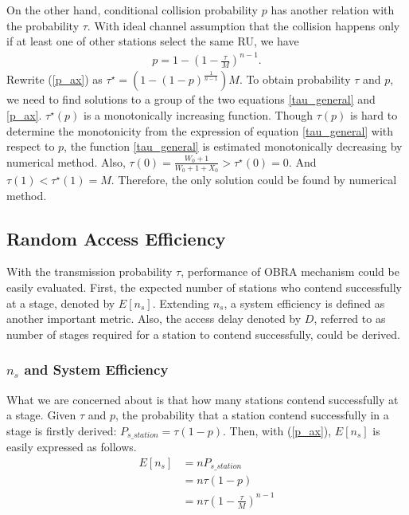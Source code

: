 \documentclass[journal]{IEEEtran}
\begin{document}
On the other hand, conditional collision probability $p$ has another relation with the probability $\tau$. 
With ideal channel assumption that the collision happens only if at least one of other stations select the same RU, we have 
\begin{align}
\label{p_ax}
p = 1-\left( 1-\frac{\tau}{M} \right)^{n-1}.
\end{align}
Rewrite (\ref{p_ax}) as $\tau^\star = \left(1-(1-p)^\frac{1}{n-1} \right)M$. 
To obtain probability $\tau$ and $p$, we need to find solutions to a group of the two equations \ref{tau_general} and \ref{p_ax}.
$\tau^\star(p)$ is a monotonically increasing function. 
Though $\tau(p)$ is hard to determine the monotonicity from the expression of equation \ref{tau_general} with respect to $p$, the  function \ref{tau_general} is estimated monotonically decreasing by numerical method. 
Also, $\tau(0) = \frac{W_0+1}{W_0+1+X_0}> \tau^\star(0) = 0$.
And $\tau(1) < \tau^\star(1) = M$. 
Therefore, the only solution could be found by numerical method.



\subsection{Random Access Efficiency}
With the transmission probability $\tau$, performance of OBRA mechanism could be easily evaluated. 
First, the expected number of stations who contend successfully at a stage, denoted by $E[n_s]$. 
Extending $n_s$, a system efficiency is defined as another important metric.
Also, the access delay denoted by $D$, referred to as number of stages required for a station to contend successfully, could be derived. 

\subsubsection{$n_s$ and System Efficiency}
What we are concerned about is that how many stations contend successfully at a stage.
Given $\tau$ and $p$, the probability that a station contend successfully in a stage is firstly derived: $P_{s\_station} = \tau (1-p)$.
Then, with (\ref{p_ax}), $E[n_s]$ is easily expressed as follows. 
\begin{align}
\label{equ_ns}
E[n_s] &= n P_{s\_station} \nonumber \\
		&= n\tau (1-p) \nonumber \\
		&= n\tau (1-\frac{\tau}{M})^{n-1}
\end{align}
\end{document}
